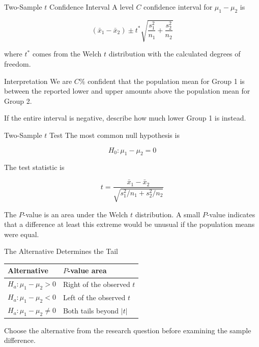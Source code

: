 \documentclass[aspectratio=169,10pt]{beamer}
\begin{document}
\begin{frame}{Two-Sample $t$ Confidence Interval}
A level $C$ confidence interval for $\mu_1-\mu_2$ is

\[
(\bar{x}_1-\bar{x}_2)
\pm
t^*\sqrt{\frac{s_1^2}{n_1}+\frac{s_2^2}{n_2}}
\]

where $t^*$ comes from the Welch $t$ distribution with the calculated degrees of freedom.

\begin{block}{Interpretation}
We are $C\%$ confident that the population mean for Group 1 is between the reported lower and upper amounts above the population mean for Group 2.
\end{block}

If the entire interval is negative, describe how much lower Group 1 is instead.
\end{frame}

\begin{frame}{Two-Sample $t$ Test}
The most common null hypothesis is

\[
H_0:\mu_1-\mu_2=0
\]

The test statistic is

\[
t=
\frac{\bar{x}_1-\bar{x}_2}
{\sqrt{s_1^2/n_1+s_2^2/n_2}}
\]

The $P$-value is an area under the Welch $t$ distribution. A small $P$-value indicates that a difference at least this extreme would be unusual if the population means were equal.
\end{frame}

\begin{frame}{The Alternative Determines the Tail}
\begin{center}
\begin{tabularx}{0.88\textwidth}{>{\centering\arraybackslash}p{} X}
\toprule
\textbf{Alternative} & \textbf{$P$-value area} \\
\midrule
$H_a:\mu_1-\mu_2>0$ & Right of the observed $t$ \\
$H_a:\mu_1-\mu_2<0$ & Left of the observed $t$ \\
$H_a:\mu_1-\mu_2\ne0$ & Both tails beyond $|t|$ \\
\bottomrule
\end{tabularx}
\end{center}

Choose the alternative from the research question before examining the sample difference.
\end{frame}
\end{document}

